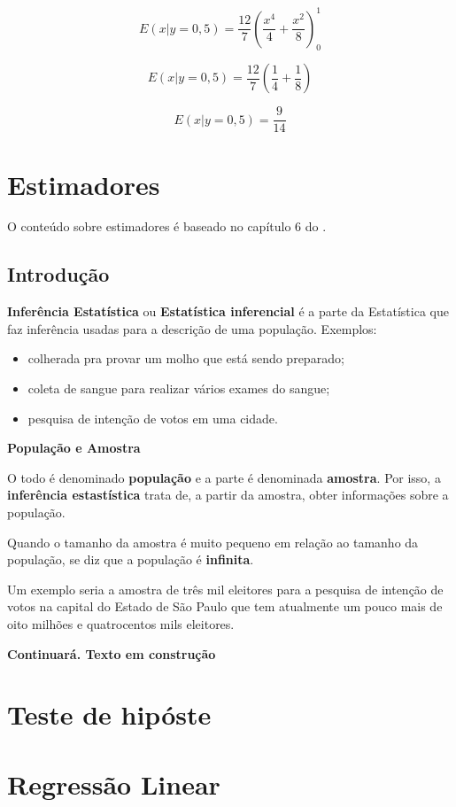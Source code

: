\documentclass[
]{book}
\providecommand{\tightlist}{%
  \setlength{\itemsep}{0pt}\setlength{\parskip}{0pt}}
\begin{document}
\[
  E(x|y=0,5) = \dfrac{12}{7}\left( \dfrac{x^4}{4} + \dfrac{x^2}{8} \right)_{0}^{1}
\]

\[
  E(x|y=0,5) = \dfrac{12}{7}\left( \dfrac{1}{4} + \dfrac{1}{8} \right)
\]

\[
  E(x|y=0,5) = \dfrac{9}{14}
\]

\hypertarget{estimadores}{%
\chapter{Estimadores}\label{estimadores}}

O conteúdo sobre estimadores é baseado no capítulo 6 do \citet{Sartoris2013}.

\hypertarget{introduuxe7uxe3o-1}{%
\section{Introdução}\label{introduuxe7uxe3o-1}}

\textbf{Inferência Estatística} ou \textbf{Estatística inferencial} é a parte da Estatística que faz inferência usadas para a descrição de uma população. Exemplos:

\begin{itemize}
\tightlist
\item
  colherada pra provar um molho que está sendo preparado;
\item
  coleta de sangue para realizar vários exames do sangue;
\item
  pesquisa de intenção de votos em uma cidade.
\end{itemize}

\textbf{População e Amostra}

O todo é denominado \textbf{população} e a parte é denominada \textbf{amostra}. Por isso, a \textbf{inferência estastística} trata de, a partir da amostra, obter informações sobre a população.

Quando o tamanho da amostra é muito pequeno em relação ao tamanho da população, se diz que a população é \textbf{infinita}.

Um exemplo seria a amostra de três mil eleitores para a pesquisa de intenção de votos na capital do Estado de São Paulo que tem atualmente um pouco mais de oito milhões e quatrocentos mils eleitores.

\textbf{Continuará. Texto em construção}

\hypertarget{teste-de-hipuxf3ste}{%
\chapter{Teste de hipóste}\label{teste-de-hipuxf3ste}}

\hypertarget{regressuxe3o-linear}{%
\chapter{Regressão Linear}\label{regressuxe3o-linear}}

  
\end{document}
